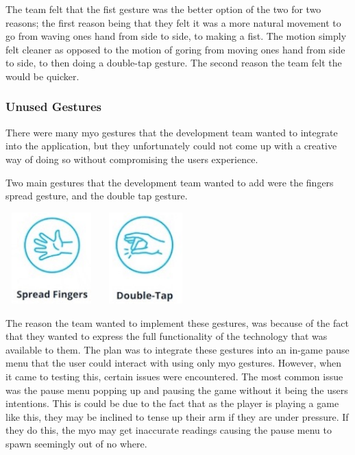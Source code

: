 \documentclass{article}
\begin{document}
The team felt that the  fist gesture was the better option of the two for two reasons; the first reason being that they felt it was a more natural movement to go from waving ones hand from side to side, to making a fist. The motion simply felt cleaner as opposed to the motion of goring from moving ones hand from side to side, to then doing a double-tap gesture.
The second reason the team felt the would be quicker.

\subsubsection{Unused Gestures}
There were many myo gestures that the development team wanted to integrate into the application, but they unfortunately could not come up with a creative way of doing so without compromising the users experience.

Two main gestures that the development team wanted to add were the fingers spread gesture, and the double tap gesture.

\bigskip

\includegraphics[width=100pt, height=100pt]{img/Spread.PNG}
\includegraphics[width=100pt, height=100pt]{img/DoubleTap.PNG}

\bigskip

The reason the team wanted to implement these gestures, was because of the fact that they wanted to express the full functionality of the technology that was available to them. The plan was to integrate these gestures into an in-game pause menu that the user could interact with using only myo gestures. However, when it came to testing this, certain issues were encountered. The most common issue was the pause menu popping up and pausing the game without it being the users intentions. This is could be due to the fact that as the player is playing a game like this, they may be inclined to tense up their arm if they are under pressure. If they do this, the myo may get inaccurate readings causing the pause menu to spawn seemingly out of no where. 
\end{document}
